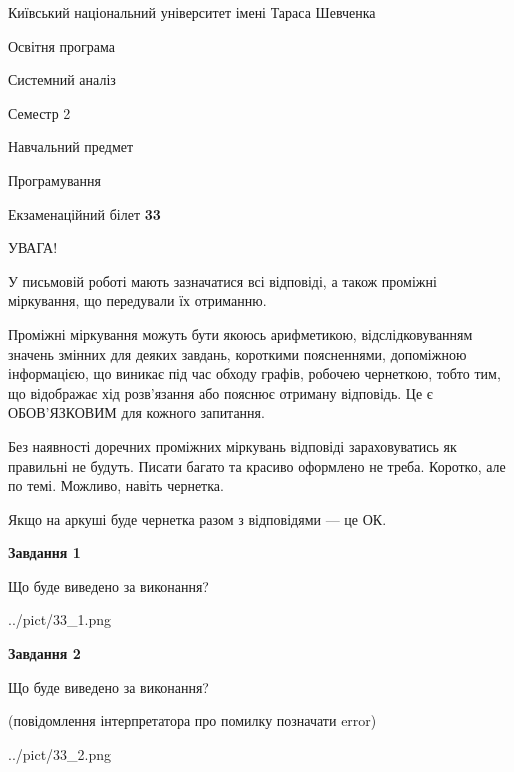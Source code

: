 \documentclass[12pt, ukrainian]{article}
\begin{document}
{{\begin {small}\par
{ \center  Київський національний університет імені Тараса Шевченка \par}
{\parbox {5 cm}{Освітня програма \hfill}{\parbox {7 cm}{Системний аналіз \hfill}}\parbox {6 cm}{\hfill Семестр 2}}\par
{\parbox {5 cm} {Навчальний предмет \hfill}\parbox {7 cm}{Програмування \hfill}\parbox {6cm}{\hfill}\par}\vspace{-7pt} \end{small}}{\center Екзаменаційний білет \No \textbf
{ 33 }\par}}
{
\begin {large}
УВАГА!

У письмовій роботі мають зазначатися всі відповіді, а також проміжні міркування, що передували їх отриманню.

Проміжні міркування можуть бути якоюсь арифметикою, відслідковуванням зна\-чень змінних для деяких завдань,
короткими поясненнями, допоміжною інформацією, що виникає під час обходу графів, робочею чернеткою,
тобто тим, що відображає хід розв’язання або пояснює отриману відповідь.
Це є ОБОВ’ЯЗКОВИМ для кожного запитання.

Без наявності доречних проміжних міркувань відповіді зараховуватись як правиль\-ні не будуть.
Писати багато та красиво оформлено не треба. Коротко, але по темі. Можли\-во, навіть чернетка.

Якщо на аркуші буде чернетка разом з відповідями --- це ОК.

\newpage

{\begin {center}\textbf{Завдання 1}\end {center}}\par
Що буде виведено за виконання?\par
\begin{center}
	{../pict/33_1.png}
\end{center}
\newpage

{\begin {center}\textbf{Завдання 2}\end {center}}\par
Що буде виведено за виконання?\par
 (повідомлення інтерпретатора про помилку позначати error)\par
\begin{center}
	{../pict/33_2.png}
\end{center}
\newpage


\end{large}}
\end{document}
